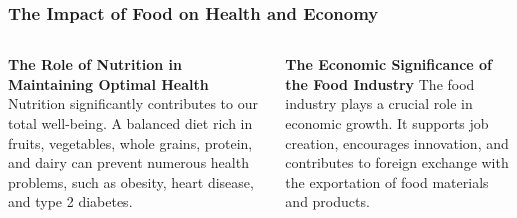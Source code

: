 \documentclass[5pt]{beamer}
\begin{document}
\begin{frame}
\frametitle{The Impact of Food on Health and Economy}
\begin{columns}
\begin{column}{0.45\textwidth}
\begin{block}{\textbf{The Role of Nutrition in Maintaining Optimal Health}}
Nutrition significantly contributes to our total well-being. A balanced diet rich in fruits, vegetables, whole grains, protein, and dairy can prevent numerous health problems, such as obesity, heart disease, and type 2 diabetes.
\end{block}
\end{column}
\begin{column}{0.45\textwidth}
\begin{block}{\textbf{The Economic Significance of the Food Industry}}
The food industry plays a crucial role in economic growth. It supports job creation, encourages innovation, and contributes to foreign exchange with the exportation of food materials and products.
\end{block}
\end{column}
\end{columns}
\end{frame}
\end{document}

